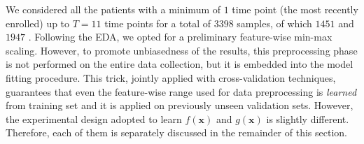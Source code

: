 We considered all the patients with a minimum of $1$ time point (the most recently enrolled) up to $T=11$ time points for a total of $3398$ samples, of which $1451$ \RR and $1947$ \SP.
Following the EDA, we opted for a preliminary feature-wise min-max scaling.
However, to promote unbiasedness of the results, this preprocessing phase is not performed on the entire data collection, but it is embedded into the model fitting procedure. This trick, jointly applied with cross-validation techniques, guarantees that even the feature-wise range used for data preprocessing is \textit{learned} from training set and it is applied on previously unseen validation sets.
However, the experimental design adopted to learn $f(\bm{x})$ and $g(\bm{x})$ is slightly different. Therefore, each of them is separately discussed in the remainder of this section.


